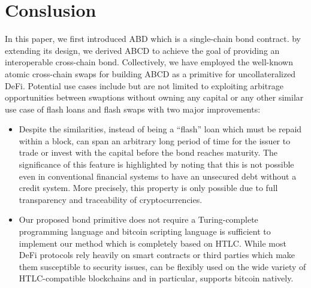 \section{Conslusion}

In this paper, we first introduced ABD which is a single-chain bond contract.  by extending its design, we derived ABCD to achieve the goal of providing an interoperable cross-chain bond. Collectively, we have employed the well-known atomic cross-chain swaps for building ABCD as a primitive for uncollateralized DeFi. Potential use cases include but are not limited to exploiting arbitrage opportunities between swaptions without owning any capital or any other similar use case of flash loans and flash swaps with two major improvements: 
\begin{itemize}
    \item Despite the similarities, instead of being a ``flash'' loan which must be repaid within a block, \abcd can span an arbitrary long period of time for the issuer to trade or invest with the capital before the bond reaches maturity. The significance of this feature is highlighted by noting that this is not possible even in conventional financial systems to have an unsecured debt without a credit system. More precisely, this property is only possible due to full transparency and traceability of cryptocurrencies.
    \item Our proposed bond primitive does not require a Turing-complete programming language and bitcoin scripting language is sufficient to implement our method which is completely based on HTLC. While most DeFi protocols rely heavily on smart contracts or third parties which make them susceptible to security issues, \abcd can be flexibly used on the wide variety of HTLC-compatible blockchains and in particular, supports bitcoin natively.
\end{itemize}
 